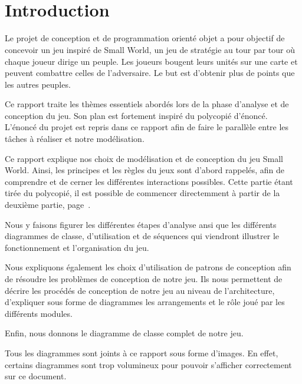 \documentclass[a4paper]{article}%
\begin{document}


\newpage
\setcounter{page}{2}
~
\newpage

\tableofcontents

\newpage
~
\newpage

\section*{Introduction}

Le projet de conception et de programmation orienté objet a pour objectif de concevoir un jeu inspiré de Small World, un jeu de stratégie au tour par tour où chaque joueur dirige un peuple. Les joueurs bougent leurs unités sur une carte et peuvent combattre celles de l'adversaire. Le but est d'obtenir plus de points que les autres peuples.

\medskip

Ce rapport traite les thèmes essentiels abordés lors de la phase d'analyse et de conception du jeu. Son plan est fortement inspiré du polycopié d'énoncé. L'énoncé du projet est repris dans ce rapport afin de faire le parallèle entre les tâches à réaliser et notre modélisation. 

\medskip

Ce rapport explique nos choix de modélisation et de conception du jeu Small World.
Ainsi, les principes et les règles du jeux sont d'abord rappelés, afin de comprendre et de cerner les différentes interactions possibles. Cette partie étant tirée du polycopié, il est possible de commencer directemment à partir de la deuxième partie, page~\pageref{debut}.

Nous y faisons figurer les différentes étapes d'analyse ansi que les différents diagrammes de classe, d'utilisation et de séquences qui viendront illustrer le fonctionnement et l'organisation du jeu.

Nous expliquons également les choix d'utilisation de patrons de conception afin de résoudre les problèmes de conception de notre jeu.
Ils nous permettent de décrire les procédés de conception de notre jeu au niveau de l'architecture, d'expliquer sous forme de diagrammes les arrangements et le rôle joué par les différents modules.

Enfin, nous donnons le diagramme de classe complet de notre jeu.

\medskip

Tous les diagrammes sont joints à ce rapport sous forme d'images. En effet, certains diagrammes sont trop volumineux pour pouvoir s'afficher correctement sur ce document. 
\end{document}

